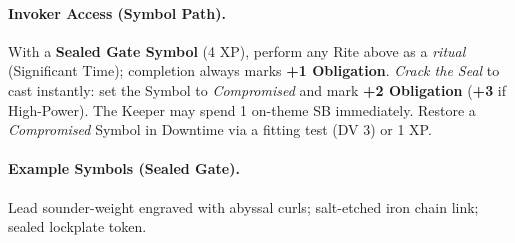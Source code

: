 \paragraph{Invoker Access (Symbol Path).}
With a \textbf{Sealed Gate Symbol} (4 XP), perform any Rite above as a \emph{ritual} (Significant Time); completion always marks \textbf{+1 Obligation}. \textit{Crack the Seal} to cast instantly: set the Symbol to \emph{Compromised} and mark \textbf{+2 Obligation} (\textbf{+3} if High-Power). The Keeper may spend 1 on-theme SB immediately. Restore a \emph{Compromised} Symbol in Downtime via a fitting test (DV 3) or 1 XP.

\paragraph{Example Symbols (Sealed Gate).}
Lead sounder-weight engraved with abyssal curls; salt-etched iron chain link; sealed lockplate token.
